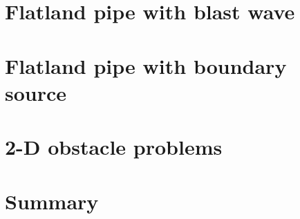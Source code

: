 \section{Flatland pipe with blast wave}

\section{Flatland pipe with boundary source}

\section{2-D obstacle problems}

\section{Summary}

